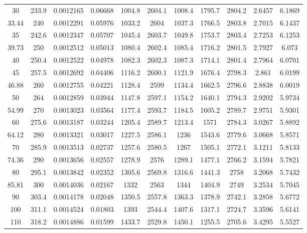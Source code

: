 \begin{longtable}{ccccccccccc}
	30      & 233.9 & 0.0012165 & 0.06668  & 1004.8 & 2604.1 & 1008.4 & 1795.7 & 2804.2 & 2.6457 & 6.1869      \\
	33.44   & 240   & 0.0012291 & 0.05976  & 1033.2 & 2604   & 1037.3 & 1766.5 & 2803.8 & 2.7015 & 6.1437      \\
	35      & 242.6 & 0.0012347 & 0.05707  & 1045.4 & 2603.7 & 1049.8 & 1753.7 & 2803.4 & 2.7253 & 6.1253      \\
	39.73   & 250   & 0.0012512 & 0.05013  & 1080.4 & 2602.4 & 1085.4 & 1716.2 & 2801.5 & 2.7927 & 6.073       \\
	40      & 250.4 & 0.0012522 & 0.04978  & 1082.3 & 2602.3 & 1087.3 & 1714.1 & 2801.4 & 2.7964 & 6.0701      \\
	45      & 257.5 & 0.0012692 & 0.04406  & 1116.2 & 2600.1 & 1121.9 & 1676.4 & 2798.3 & 2.861  & 6.0199      \\
	46.88   & 260   & 0.0012755 & 0.04221  & 1128.4 & 2599   & 1134.4 & 1662.5 & 2796.6 & 2.8838 & 6.0019      \\
	50      & 264   & 0.0012859 & 0.03944  & 1147.8 & 2597.1 & 1154.2 & 1640.1 & 2794.3 & 2.9202 & 5.9734      \\
	54.99   & 270   & 0.0013023 & 0.03564  & 1177.4 & 2593.7 & 1184.5 & 1605.2 & 2789.7 & 2.9751 & 5.9301      \\
	60      & 275.6 & 0.0013187 & 0.03244  & 1205.4 & 2589.7 & 1213.4 & 1571   & 2784.3 & 3.0267 & 5.8892      \\
	64.12   & 280   & 0.0013321 & 0.03017  & 1227.5 & 2586.1 & 1236   & 1543.6 & 2779.6 & 3.0668 & 5.8571      \\
	70      & 285.9 & 0.0013513 & 0.02737  & 1257.6 & 2580.5 & 1267   & 1505.1 & 2772.1 & 3.1211 & 5.8133      \\
	74.36   & 290   & 0.0013656 & 0.02557  & 1278.9 & 2576   & 1289.1 & 1477.1 & 2766.2 & 3.1594 & 5.7821      \\
	80      & 295.1 & 0.0013842 & 0.02352  & 1305.6 & 2569.8 & 1316.6 & 1441.3 & 2758   & 3.2068 & 5.7432      \\
	85.81   & 300   & 0.0014036 & 0.02167  & 1332   & 2563   & 1344   & 1404.9 & 2749   & 3.2534 & 5.7045      \\
	90      & 303.4 & 0.0014178 & 0.02048  & 1350.5 & 2557.8 & 1363.3 & 1378.9 & 2742.1 & 3.2858 & 5.6772      \\
	100     & 311.1 & 0.0014524 & 0.01803  & 1393   & 2544.4 & 1407.6 & 1317.1 & 2724.7 & 3.3596 & 5.6141      \\
	110     & 318.2 & 0.0014886 & 0.01599  & 1433.7 & 2529.8 & 1450.1 & 1255.5 & 2705.6 & 3.4295 & 5.5527      \\

\end{longtable}
